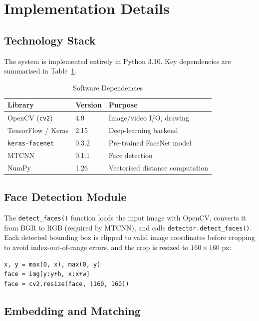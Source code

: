 \documentclass[conference]{IEEEtran}
\begin{document}
\section{Implementation Details}

\subsection{Technology Stack}

The system is implemented entirely in Python 3.10. Key dependencies are
summarised in Table~\ref{tab:stack}.

\begin{table}[htbp]
\caption{Software Dependencies}
\label{tab:stack}
\begin{center}
\begin{tabular}{|l|l|l|}
\hline
\textbf{Library} & \textbf{Version} & \textbf{Purpose} \\
\hline
OpenCV (\texttt{cv2}) & 4.9 & Image/video I/O, drawing \\
TensorFlow / Keras & 2.15 & Deep-learning backend \\
\texttt{keras-facenet} & 0.3.2 & Pre-trained FaceNet model \\
MTCNN & 0.1.1 & Face detection \\
NumPy & 1.26 & Vectorised distance computation \\
\hline
\end{tabular}
\end{center}
\end{table}

\subsection{Face Detection Module}

The \texttt{detect\_faces()} function loads the input image with OpenCV,
converts it from BGR to RGB (required by MTCNN), and calls
\texttt{detector.detect\_faces()}. Each detected bounding box is clipped
to valid image coordinates before cropping to avoid index-out-of-range
errors, and the crop is resized to $160\times160$ px:

\begin{verbatim}
x, y = max(0, x), max(0, y)
face = img[y:y+h, x:x+w]
face = cv2.resize(face, (160, 160))
\end{verbatim}

\subsection{Embedding and Matching}
\end{document}
